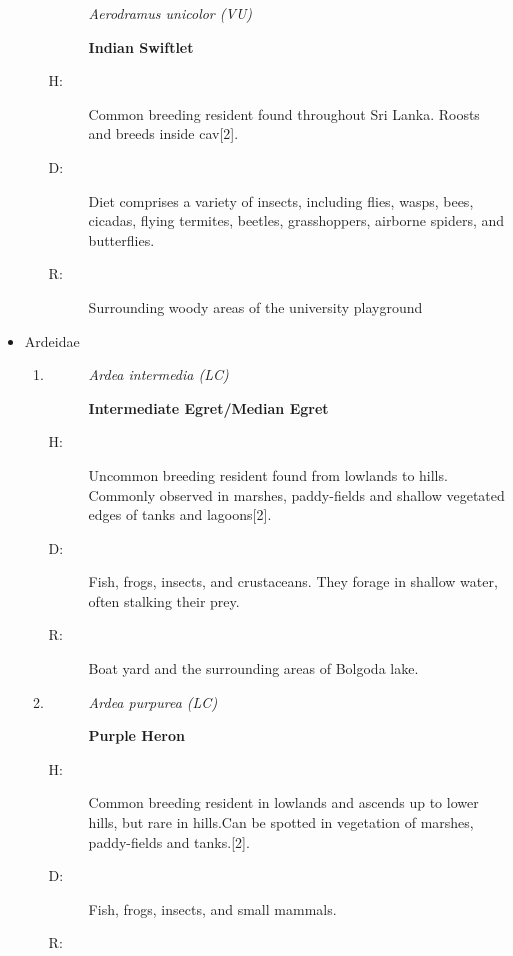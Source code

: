 \begin{itemize}
\begin{enumerate}
\begin{description}
\item[]%
\textit{Aerodramus unicolor (VU)}%
\item[]%
\textbf{Indian Swiftlet}%
\end{description}%
\begin{description}%
\item[H: ]%
Common breeding resident found throughout Sri Lanka. Roosts and breeds inside cav{[}2{]}.%
\item[D: ]%
Diet comprises a variety of insects, including flies, wasps, bees, cicadas, flying termites, beetles, grasshoppers, airborne spiders, and butterflies.%
\item[R: ]%
Surrounding woody areas of the university playground%
\end{description}%
\end{enumerate}%
\item%
Ardeidae%
\begin{enumerate}%
\item%
\begin{description}%
\item[]%
\textit{Ardea intermedia (LC)}%
\item[]%
\textbf{Intermediate Egret/Median Egret}%
\end{description}%
\begin{description}%
\item[H: ]%
Uncommon breeding resident found from lowlands to hills. Commonly observed in marshes, paddy-fields and shallow vegetated edges of tanks and lagoons{[}2{]}.%
\item[D: ]%
Fish, frogs, insects, and crustaceans. They forage in shallow water, often stalking their prey.%
\item[R: ]%
Boat yard and the surrounding areas of Bolgoda lake.%
\end{description}%
\item%
\begin{description}%
\item[]%
\textit{Ardea purpurea (LC)}%
\item[]%
\textbf{Purple Heron}%
\end{description}%
\begin{description}%
\item[H: ]%
Common breeding resident in lowlands and ascends up to lower hills, but rare in hills.Can be spotted in vegetation of marshes, paddy-fields and tanks.{[}2{]}.%
\item[D: ]%
Fish, frogs, insects, and small mammals.%
\item[R: ]%

\end{description}
\end{enumerate}
\end{itemize}
